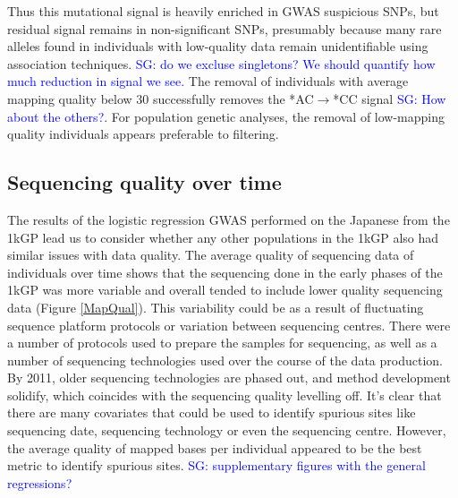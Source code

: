 \documentclass[9pt,lineno]{elife}
\newcommand{\sgcomment}[1]{\textcolor{blue}{SG: #1}}
\begin{document}
Thus this mutational signal is heavily enriched in GWAS suspicious SNPs, but residual signal remains in non-significant SNPs, presumably because many rare alleles found in individuals with low-quality data remain unidentifiable using association techniques. \sgcomment{do we excluse singletons? We should quantify how much reduction in signal we see.}
The removal of individuals with average mapping quality below 30 successfully removes the *AC${\rightarrow}$*CC signal \sgcomment{How about the others?}.
For population genetic analyses, the removal of low-mapping quality individuals appears preferable to filtering. 

	\subsection{Sequencing quality over time}
The results of the logistic regression GWAS performed on the Japanese from the 1kGP lead us to consider whether any other populations in the 1kGP also had similar issues with data quality.
The average quality of sequencing data of individuals over time shows that the sequencing done in the early phases of the 1kGP was more variable and overall tended to include lower quality sequencing data (Figure \ref{MapQual}).
This variability could be as a result of fluctuating sequence platform protocols or variation between sequencing centres.
There were a number of protocols used to prepare the samples for sequencing, as well as a number of sequencing technologies used over the course of the data production.
By 2011, older sequencing technologies are phased out, and method development solidify, which coincides with the sequencing quality levelling off.
It's clear that there are many covariates that could be used to identify spurious sites like sequencing date, sequencing technology or even the sequencing centre. 
However, the average quality of mapped bases per individual appeared to be the best metric to identify spurious sites. \sgcomment{supplementary figures with the general regressions?}
\end{document}
